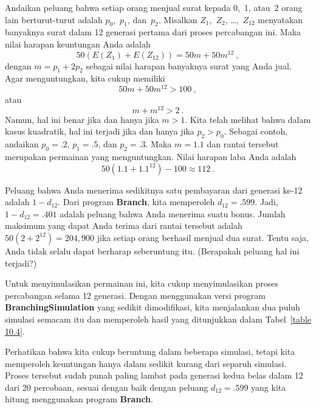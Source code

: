 \begin{example}
Andaikan peluang bahwa setiap orang menjual surat kepada
0,~1, atau~2 orang lain berturut-turut adalah $p_0$,~$p_1$, dan~$p_2$.  Misalkan $Z_1$,~$Z_2$,
\ldots,~$Z_{12}$ menyatakan banyaknya surat dalam 12 generasi pertama dari
proses percabangan ini.  Maka nilai harapan keuntungan Anda adalah
$$
50(E(Z_1) + E(Z_{12})) = 50m + 50m^{12}\ ,
$$
dengan $m = p_1 + 2p_2$ sebagai nilai harapan banyaknya surat yang Anda jual.  Agar
menguntungkan, kita cukup memiliki
$$
50m + 50m^{12} > 100\ ,
$$
atau
$$
m + m^{12} > 2\ .
$$
Namun, hal ini benar jika dan hanya jika $m > 1$.  Kita telah melihat bahwa dalam
kasus kuadratik, hal ini terjadi jika dan hanya jika $p_2 > p_0$.  Sebagai contoh,
andaikan $p_0 = .2$, $p_1 = .5$, dan $p_2 = .3$.  Maka $m = 1.1$ dan rantai
tersebut merupakan permainan yang menguntungkan.  Nilai harapan laba Anda adalah
$$
50(1.1 + 1.1^{12}) - 100 \approx 112\ .
$$

Peluang bahwa Anda menerima sedikitnya satu pembayaran dari generasi ke-12
adalah $1 - d_{12}$.  Dari program {\bf Branch}, kita memperoleh $d_{12} =
.599$.  Jadi, $1 - d_{12} = .401$ adalah peluang bahwa Anda menerima suatu
bonus.  Jumlah maksimum yang dapat Anda terima dari rantai tersebut adalah $50(2 +
2^{12}) = 204{,}900$ jika setiap orang berhasil menjual dua surat.  Tentu
saja, Anda tidak selalu dapat berharap seberuntung itu.  (Berapakah peluang
hal ini terjadi?)

Untuk menyimulasikan permainan ini, kita cukup menyimulasikan proses percabangan selama 12
generasi.  Dengan menggunakan versi program {\bf BranchingSimulation} yang sedikit
dimodifikasi, kita menjalankan dua puluh simulasi semacam itu dan memperoleh
hasil yang ditunjukkan dalam Tabel~\ref{table 10.4}.

Perhatikan bahwa kita cukup beruntung dalam beberapa simulasi, tetapi kita memperoleh keuntungan hanya
dalam sedikit kurang dari separuh simulasi.  Proses tersebut sudah punah paling lambat pada generasi kedua belas
dalam 12 dari 20 percobaan, sesuai dengan baik dengan peluang $d_{12}
= .599$ yang kita hitung menggunakan program {\bf Branch}.


\end{example}
